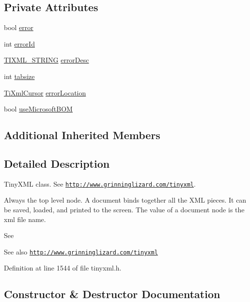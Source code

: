 \subsection*{Private Attributes}
\begin{DoxyCompactItemize}
\item 
bool \hyperlink{class_ti_xml_document_a1ff6a063602f31acae6f37fc049d8bbd}{error}
\item 
int \hyperlink{class_ti_xml_document_acdef97a4bb80729ac6863dd54cee7eeb}{error\+Id}
\item 
\hyperlink{tinyxml_8h_a92bada05fd84d9a0c9a5bbe53de26887}{T\+I\+X\+M\+L\+\_\+\+S\+T\+R\+I\+NG} \hyperlink{class_ti_xml_document_a2da9a95ba3f9c895a8d7f4de7122a642}{error\+Desc}
\item 
int \hyperlink{class_ti_xml_document_af2fa6a010b903d893d52cc6fee5575a1}{tabsize}
\item 
\hyperlink{struct_ti_xml_cursor}{Ti\+Xml\+Cursor} \hyperlink{class_ti_xml_document_aa4030f989f1549f6b897147fc2851d1a}{error\+Location}
\item 
bool \hyperlink{class_ti_xml_document_a4d5400dec9bfb55c640428de33297886}{use\+Microsoft\+B\+OM}
\end{DoxyCompactItemize}
\subsection*{Additional Inherited Members}


\subsection{Detailed Description}
Tiny\+X\+ML class. See \href{http://www.grinninglizard.com/tinyxml}{\tt http\+://www.\+grinninglizard.\+com/tinyxml}. 

Always the top level node. A document binds together all the X\+ML pieces. It can be saved, loaded, and printed to the screen. The \textquotesingle{}value\textquotesingle{} of a document node is the xml file name.

See \begin{DoxySeeAlso}{See also}
\href{http://www.grinninglizard.com/tinyxml}{\tt http\+://www.\+grinninglizard.\+com/tinyxml} 
\end{DoxySeeAlso}


Definition at line 1544 of file tinyxml.\+h.



\subsection{Constructor \& Destructor Documentation}
\hypertarget{class_ti_xml_document_a9f5e84335708fde98400230f9f12659c}{}\label{class_ti_xml_document_a9f5e84335708fde98400230f9f12659c} 
